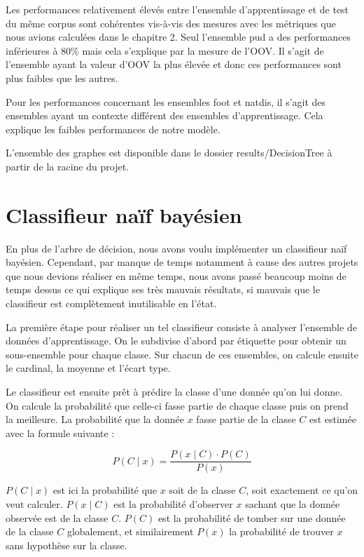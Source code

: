 \documentclass[french, 14pt]{memoir}
\begin{document}
Les performances relativement élevés entre l'ensemble d'apprentissage et de test du même corpus sont cohérentes vis-à-vis des mesures avec les métriques que nous avions calculées dans le chapitre 2. Seul l'ensemble pud a des performances inférieures à 80\% mais cela s'explique par la mesure de l'OOV. Il s'agit de l'ensemble ayant la valeur d'OOV la plus élevée et donc ces performances sont plus faibles que les autres.

Pour les performances concernant les ensembles foot et natdis, il s'agit des ensembles ayant un contexte différent des ensembles d'apprentissage. Cela explique les faibles performances de notre modèle. 

L'ensemble des graphes est disponible dans le dossier results/DecisionTree à partir de la racine du projet.

\section{Classifieur naïf bayésien}

En plus de l'arbre de décision, nous avons voulu implémenter un classifieur naïf bayésien. Cependant, par manque de temps notamment à cause des autres projets que nous devions réaliser en même temps, nous avons passé beaucoup moins de temps dessus ce qui explique ses très mauvais résultats, si mauvais que le classifieur est complètement inutilisable en l'état. 

La première étape pour réaliser un tel classifieur consiste à analyser l'ensemble de données d'apprentissage. On le subdivise d'abord par étiquette pour obtenir un sous-ensemble pour chaque classe. Sur chacun de ces ensembles, on calcule ensuite le cardinal, la moyenne et l'écart type.

Le classifieur est ensuite prêt à prédire la classe d'une donnée qu'on lui donne. On calcule la probabilité que celle-ci fasse partie de chaque classe puis on prend la meilleure. La probabilité que la donnée $x$ fasse partie de la classe $C$ est estimée avec la formule suivante :

\begin{equation}
P(C \mid x) = \frac{P(x \mid C) \cdot P(C)}{P(x)}
\end{equation}

$P(C \mid x)$ est ici la probabilité que $x$ soit de la classe $C$, soit exactement ce qu'on veut calculer. $P(x \mid C)$ est la probabilité d'observer $x$ sachant que la donnée observée est de la classe $C$. $P(C)$ est la probabilité de tomber sur une donnée de la classe $C$ globalement, et similairement $P(x)$ la probabilité de trouver $x$ sans hypothèse sur la classe.
\end{document}
